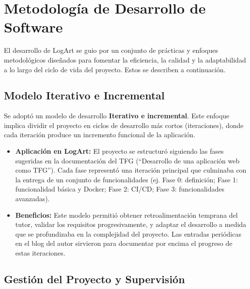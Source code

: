 \section{Metodología de Desarrollo de Software}
\label{sec:metodologiaDesarrollo}

El desarrollo de LogArt se guio por un conjunto de prácticas y enfoques metodológicos diseñados para fomentar la eficiencia, la calidad y la adaptabilidad a lo largo del ciclo de vida del proyecto. Estos se describen a continuación.

\subsection{Modelo Iterativo e Incremental}
\label{sec:modeloIterativoIncremental}

Se adoptó un modelo de desarrollo \textbf{Iterativo e incremental}. Este enfoque implica dividir el proyecto en ciclos de desarrollo más cortos (iteraciones), donde cada iteración produce un incremento funcional de la aplicación.
    \begin{itemize}
        \item \textbf{Aplicación en LogArt:} El proyecto se estructuró siguiendo las fases sugeridas en la documentación del TFG (``Desarrollo de una aplicación web como TFG''). Cada fase representó una iteración principal que culminaba con la entrega de un conjunto de funcionalidades (ej. Fase 0: definición; Fase 1: funcionalidad básica y Docker; Fase 2: CI/CD; Fase 3: funcionalidades avanzadas).
        \item \textbf{Beneficios:} Este modelo permitió obtener retroalimentación temprana del tutor, validar los requisitos progresivamente, y adaptar el desarrollo a medida que se profundizaba en la complejidad del proyecto. Las entradas periódicas en el blog del autor\cite{MorenoMediumBlogLogArt} sirvieron para documentar por encima el progreso de estas iteraciones.
    \end{itemize}

\subsection{Gestión del Proyecto y Supervisión}
\label{sec:gestionProyectoSupervision}

